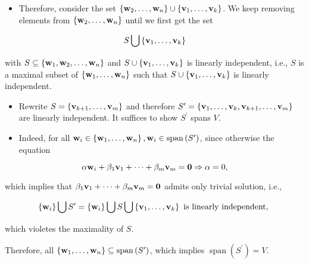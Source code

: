 \documentclass[11pt]{article}
\begin{document}
\begin{itemize}
\item Therefore, consider the set \(\left\{  {{\bf w}_2,\ldots ,{\bf w}_n}\right\}   \cup  \left\{  {{\bf v}_1,\ldots ,{\bf v}_{k}}\right\}\). We keep removing elements from \(\left\{  {{\bf w}_2,\ldots ,{\bf w}_n}\right\}\) until we first get the set
\end{itemize}

\[
S\bigcup \left\{  {{\bf v}_1,\ldots ,{\bf v}_{k}}\right\}
\]

with \(S \subseteq  \left\{  {{\bf w}_1,{\bf w}_2,\ldots ,{\bf w}_n}\right\}\) and \(S \cup  \left\{  {{\bf v}_1,\ldots ,{\bf v}_{k}}\right\}\) is linearly independent, i.e., \(S\) is a maximal subset of \(\left\{  {{\bf w}_1,\ldots ,{\bf w}_n}\right\}\) such that \(S \cup  \left\{  {{\bf v}_1,\ldots ,{\bf v}_{k}}\right\}\) is linearly independent.

\begin{itemize}
\item Rewrite \(S = \left\{  {{\bf v}_{k + 1},\ldots ,{\bf v}_{m}}\right\}\) and therefore \({S}^{\prime } = \left\{  {{\bf v}_1,\ldots ,{\bf v}_{k},{\bf v}_{k + 1},\ldots ,{\bf v}_{m}}\right\}\) are linearly independent. It suffices to show \({S}^{\prime }\) spans \(V\).
\end{itemize}

\begin{itemize}
\item Indeed, for all \({\bf w}_{i} \in  \left\{  {{\bf w}_1,\ldots ,{\bf w}_n}\right\}  ,{\bf w}_{i} \in  \operatorname{span}\left( {S}^{\prime }\right)\), since otherwise the equation
\end{itemize}

\[
\alpha {\bf w}_{i} + \beta_1{\bf v}_1 + \cdots  + \beta_{m}{\bf v}_{m} = \mathbf{0} \Rightarrow  \alpha  = 0,
\]

which implies that \(\beta_1{\bf v}_1 + \cdots  + \beta_{m}{\bf v}_{m} = \mathbf{0}\) admits only trivial solution, i.e.,

\[
\left\{  {\bf w}_{i}\right\}  \bigcup {S}^{\prime } = \left\{  {\bf w}_{i}\right\}  \bigcup S\bigcup \left\{  {{\bf v}_1,\ldots ,{\bf v}_{k}}\right\}  \text{ is linearly independent, }
\]

which violetes the maximality of \(S\).

Therefore, all \(\left\{  {{\bf w}_1,\ldots ,{\bf w}_n}\right\}   \subseteq  \operatorname{span}\left( {S}^{\prime }\right)\), which implies \(\operatorname{span}\left( {S}^{\prime }\right)  = V\).
\end{document}

